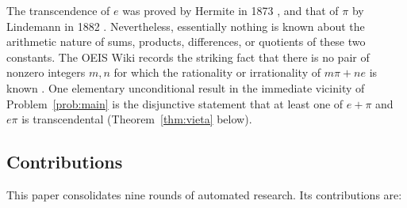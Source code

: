 \documentclass[11pt]{amsart}
\theoremstyle{definition}
\theoremstyle{remark}
\numberwithin{equation}{section}
\newcommand{\ee}{e}
\begin{document}
The transcendence of $\ee$ was proved by Hermite in 1873 \cite{Hermite1873}, and that of $\pi$ by Lindemann in 1882 \cite{Lindemann1882}. Nevertheless, essentially nothing is known about the arithmetic nature of sums, products, differences, or quotients of these two constants. The OEIS Wiki records the striking fact that there is no pair of nonzero integers $m,n$ for which the rationality or irrationality of $m\pi+n\ee$ is known \cite{OEIS}. One elementary unconditional result in the immediate vicinity of Problem~\ref{prob:main} is the disjunctive statement that at least one of $e+\pi$ and $e\pi$ is transcendental (Theorem~\ref{thm:vieta} below).

\subsection{Contributions} This paper consolidates nine rounds of automated research. Its contributions are:
\end{document}
